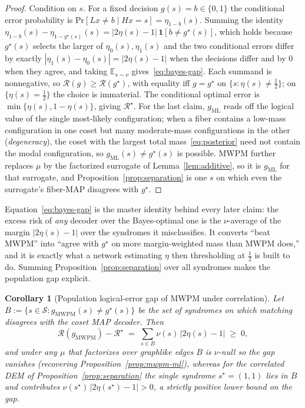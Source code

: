 \documentclass[aps,prxquantum,twocolumn,superscriptaddress,nofootinbib,longbibliography]{revtex4-2}
\newtheorem{corollary}[theorem]{Corollary}
\newcommand{\E}{\mathbb{E}}
\newcommand{\PR}{\mathrm{Pr}}
\newcommand{\ind}[1]{\mathbf{1}\!\left[#1\right]}
\newcommand{\cS}{\mathcal{S}}
\newcommand{\Risk}{\mathcal{R}}
\begin{document}
\begin{proof}
Condition on $s$. For a fixed decision $g(s)=b\in\{0,1\}$ the conditional error
probability is $\PR[Lx\neq b\mid Hx=s]=\eta_{1-b}(s)$. Summing the identity
$\eta_{1-b}(s)-\eta_{1-g^\star(s)}(s)=|2\eta(s)-1|\,\ind{b\neq g^\star(s)}$,
which holds because $g^\star(s)$ selects the larger of $\eta_0(s),\eta_1(s)$ and
the two conditional errors differ by exactly $|\eta_1(s)-\eta_0(s)|=|2\eta(s)-1|$
when the decisions differ and by $0$ when they agree, and taking $\E_{s\sim\nu}$
gives~\eqref{eq:bayes-gap}. Each summand is nonnegative, so
$\Risk(g)\ge\Risk(g^\star)$, with equality iff $g=g^\star$ on
$\{s:\eta(s)\neq\tfrac12\}$; on $\{\eta(s)=\tfrac12\}$ the choice is immaterial.
The conditional optimal error is $\min\{\eta(s),1-\eta(s)\}$, giving $\Risk^\star$.
For the last claim, $g_{\mathrm{ML}}$ reads off the logical value of the single
most-likely configuration; when a fiber contains a low-mass configuration in one
coset but many moderate-mass configurations in the other (\emph{degeneracy}), the
coset with the largest total mass~\eqref{eq:posterior} need not contain the modal
configuration, so $g_{\mathrm{ML}}(s)\neq g^\star(s)$ is possible. MWPM further
replaces $\mu$ by the factorized surrogate of Lemma~\ref{lem:additive}, so it is
$g_{\mathrm{ML}}$ for that surrogate, and Proposition~\ref{prop:separation} is one
$s$ on which even the surrogate's fiber-MAP disagrees with $g^\star$.
\end{proof}

Equation~\eqref{eq:bayes-gap} is the master identity behind every later claim:
the excess risk of \emph{any} decoder over the Bayes-optimal one is the
$\nu$-average of the margin $|2\eta(s)-1|$ over the syndromes it misclassifies.
It converts ``beat MWPM'' into ``agree with $g^\star$ on more margin-weighted
mass than MWPM does,'' and it is exactly what a network estimating $\eta$ then
thresholding at $\tfrac12$ is built to do. Summing
Proposition~\ref{prop:separation} over all syndromes makes the population gap
explicit.

\begin{corollary}[Population logical-error gap of MWPM under correlation]
\label{cor:pop-gap}
Let $B:=\{s\in\cS: g_{\mathrm{MWPM}}(s)\neq g^\star(s)\}$ be the set of syndromes
on which matching disagrees with the coset MAP decoder. Then
\begin{equation}
\label{eq:pop-gap}
  \Risk(g_{\mathrm{MWPM}})-\Risk^\star
  \;=\;\sum_{s\in B}\nu(s)\,\big|2\eta(s)-1\big|\;\ge\;0 ,
\end{equation}
and under any $\mu$ that factorizes over graphlike edges $B$ is $\nu$-null so the
gap vanishes (recovering Proposition~\ref{prop:mwpm-ml}), whereas for the
correlated DEM of Proposition~\ref{prop:separation} the single syndrome
$s^\star=(1,1)$ lies in $B$ and contributes
$\nu(s^\star)\,|2\eta(s^\star)-1|>0$, a strictly positive lower bound on the gap.
\end{corollary}
\end{document}
